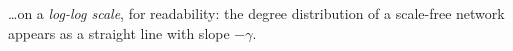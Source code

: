 \documentclass[
    preview, 
    varwidth = 9cm, 
    border = {2pt 0pt 0pt 0pt}
    ]{standalone} %
\begin{document}
\dots on a \emph{log-log scale}, for readability:
the degree distribution of a scale-free network appears as a straight line with slope \(-\gamma\).























\end{document}
